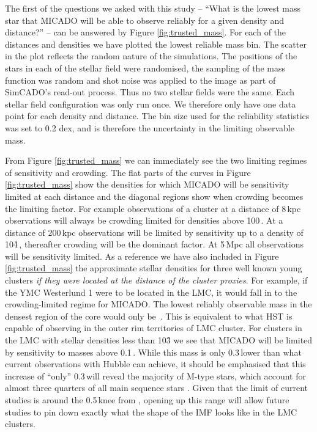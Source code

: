 The first of the questions we asked with this study -- ``What is the lowest mass star that MICADO will be able to observe reliably for a given density and distance?'' -- can be answered by Figure \ref{fig:trusted_mass}. For each of the distances and densities we have plotted the lowest reliable mass bin. The scatter in the plot reflects the random nature of the simulations. The positions of the stars in each of the stellar field were randomised, the sampling of the mass function was random and shot noise was applied to the image as part of SimCADO's read-out process. Thus no two stellar fields were the same. Each stellar field configuration was only run once. We therefore only have one data point for each density and distance. The bin size used for the reliability statistics was set to 0.2 dex, and is therefore the uncertainty in the limiting observable mass. 

From Figure \ref{fig:trusted_mass} we can immediately see the two limiting regimes of sensitivity and crowding. The flat parts of the curves in Figure \ref{fig:trusted_mass} show the densities for which MICADO will be sensitivity limited at each distance and the diagonal regions show when crowding becomes the limiting factor. For example observations of a cluster at a distance of 8\,kpc observations will always be crowding limited for densities above 100\,\spae. At a distance of 200\,kpc observations will be limited by sensitivity up to a density of 10\h4\,\spa, thereafter crowding will be the dominant factor. At 5\,Mpc all observations will be sensitivity limited. As a reference we have also included in  Figure \ref{fig:trusted_mass} the approximate stellar densities for three well known young clusters \textit{if they were located at the distance of the cluster proxies}. For example, if the YMC Westerlund 1 were to be located in the LMC, it would fall in to the crowding-limited regime for MICADO. The lowest reliably observable mass in the densest region of the core would only be \,\msun. This is equivalent to what HST is capable of observing in the outer rim territories of LMC cluster. For clusters in the LMC with stellar densities less than 10\h3 we see that MICADO will be limited by sensitivity to masses above 0.1\,\msun. While this mass is only 0.3\,\msun lower than what current observations with Hubble can achieve, it should be emphasised that this increase of ``only'' 0.3\,\msun will reveal the majority of M-type stars, which account for almost three quarters of all main sequence stars \citep{ledrew2001}. Given that the limit of current studies is around the 0.5\,\msun knee from \citet{kroupa2001}, opening up this range will allow future studies to pin down exactly what the shape of the IMF looks like in the LMC clusters. 

